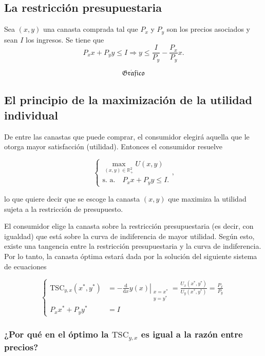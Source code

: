 \documentclass{report}
\newcommand{\GRAF}{\begin{center}$$\mathfrak{Gr\acute{a}fico}$$\end{center}}
\begin{document}
\subsection{La restricción presupuestaria}

Sea $\left(x,y\right)$ una canasta comprada tal que $P_x$ y $P_y$ son los precios asociados y sean $I$ los ingresos. Se tiene que
$$ P_x x + P_y y \leq I \Rightarrow y \leq \frac{I}{P_y} - \frac{P_x}{P_y}x\text{.}$$

\GRAF


\subsection{El principio de la maximización de la utilidad individual}

De entre las canastas que puede comprar, el consumidor elegirá aquella que le otorga mayor satisfacción (utilidad). Entonces el consumidor resuelve

$$\left\{
\begin{matrix}
\displaystyle{\max_{(x,y)\in\mathbb{R}_+^2}U\!\left(x,y\right)} \\
\text{s. a.}\quad P_xx+P_yy\le I\text{.}
\end{matrix}\right.\text{,}$$

lo que quiere decir que se escoge la canasta $\left(x,y\right)$ que maximiza la utilidad sujeta a la restricción de presupuesto.

El consumidor elige la canasta sobre la restricción presupuestaria (es decir, con igualdad) que está sobre la curva de indiferencia de mayor utilidad. Según esto, existe una tangencia entre la restricción presupuestaria y la curva de indiferencia. Por lo tanto, la canasta óptima estará dada por la solución del siguiente sistema de ecuaciones

\[
\left\{
\begin{aligned}
\mathrm{TSC}_{y,x}\!\left(x^*,y^*\right)&=\left.-\frac{\mathrm{d}}{\mathrm{d}x}y\!\left(x\right)\right|_{\begin{smallmatrix}x=x^*\\ y=y^*\end{smallmatrix}}=\frac{U_x\!\left(x^*,y^*\right)}{U_y\!\left(x^*,y^*\right)}=\frac{P_x}{P_y}\\
P_xx^*+P_yy^*&=I
\end{aligned}
\right.
\]

\subsubsection{¿Por qué en el óptimo la $\mathrm{TSC}_{y,x}$ es igual a la razón entre precios?}
\end{document}
